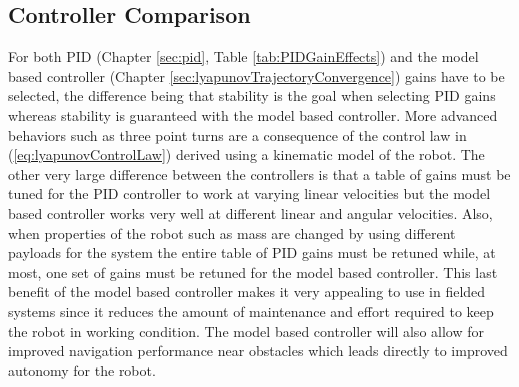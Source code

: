 \subsection{Controller Comparison}
\label{sec:controllerComparison}
For both PID (Chapter \ref{sec:pid}, Table \ref{tab:PIDGainEffects}) and the model based controller (Chapter \ref{sec:lyapunovTrajectoryConvergence}) gains have to be selected, the difference being that stability is the goal when selecting PID gains whereas stability is guaranteed with the model based controller. More advanced behaviors such as three point turns are a consequence of the control law in (\ref{eq:lyapunovControlLaw}) derived using a kinematic model of the robot. The other very large difference between the controllers is that a table of gains must be tuned for the PID controller to work at varying linear velocities but the model based controller works very well at different linear and angular velocities. Also, when properties of the robot such as mass are changed by using different payloads for the system the entire table of PID gains must be retuned while, at most, one set of gains must be retuned for the model based controller. This last benefit of the model based controller makes it very appealing to use in fielded systems since it reduces the amount of maintenance and effort required to keep the robot in working condition. The model based controller will also allow for improved navigation performance near obstacles which leads directly to improved autonomy for the robot.

